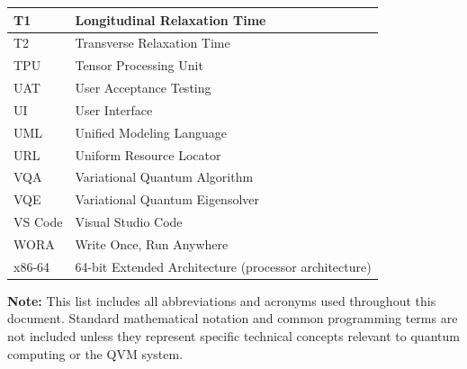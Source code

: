 \begin{longtable}{|p{3cm}|p{10cm}|}
T1 & Longitudinal Relaxation Time \\
\hline
T2 & Transverse Relaxation Time \\
\hline
TPU & Tensor Processing Unit \\
\hline
UAT & User Acceptance Testing \\
\hline
UI & User Interface \\
\hline
UML & Unified Modeling Language \\
\hline
URL & Uniform Resource Locator \\
\hline
VQA & Variational Quantum Algorithm \\
\hline
VQE & Variational Quantum Eigensolver \\
\hline
VS Code & Visual Studio Code \\
\hline
WORA & Write Once, Run Anywhere \\
\hline
x86-64 & 64-bit Extended Architecture (processor architecture) \\
\hline

\end{longtable}

\vspace{0.5cm}

\noindent\textbf{Note:} This list includes all abbreviations and acronyms used throughout this document. Standard mathematical notation and common programming terms are not included unless they represent specific technical concepts relevant to quantum computing or the QVM system.
